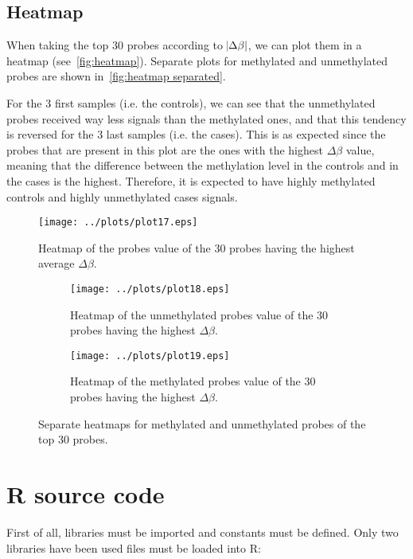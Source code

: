 \documentclass{article}
\begin{document}
\subsection{Heatmap}

When taking the top 30 probes according to $\abs {\Delta\beta}$, we can plot them in a heatmap (see~\autoref{fig:heatmap}).
Separate plots for methylated and unmethylated probes are shown in~\autoref{fig:heatmap separated}.

For the 3 first samples (i.e. the controls), we can see that the unmethylated probes received way less signals than the
methylated ones, and that this tendency is reversed for the 3 last samples (i.e. the cases). This is as expected since the
probes that are present in this plot are the ones with the highest $\Delta\beta$ value, meaning that the difference between
the methylation level in the controls and in the cases is the highest. Therefore, it is expected to have highly methylated
controls and highly unmethylated cases signals.

\begin{figure}
	\centering
	\texttt{[image: ../plots/plot17.eps]}
\caption{Heatmap of the probes value of the 30 probes having the highest average $\Delta\beta$.
\label{fig:heatmap}}
\end{figure}

\begin{figure}
	\begin{subfigure}{.5\textwidth}
		\texttt{[image: ../plots/plot18.eps]}
		\caption{Heatmap of the unmethylated probes value of the 30 probes having the highest $\Delta\beta$.
		\label{fig:heatmap unmethylated}}
	\end{subfigure}
	\begin{subfigure}{.5\textwidth}
		\texttt{[image: ../plots/plot19.eps]}
		\caption{Heatmap of the methylated probes value of the 30 probes having the highest $\Delta\beta$.
		\label{fig;heatmap methylated}}
	\end{subfigure}
	\caption{Separate heatmaps for methylated and unmethylated probes of the top 30 probes.\label{fig:heatmap separated}}
\end{figure}

\newpage
\section{R source code}

First of all, libraries must be imported and constants must be defined. Only two libraries have been used files must be loaded into R:
\end{document}
